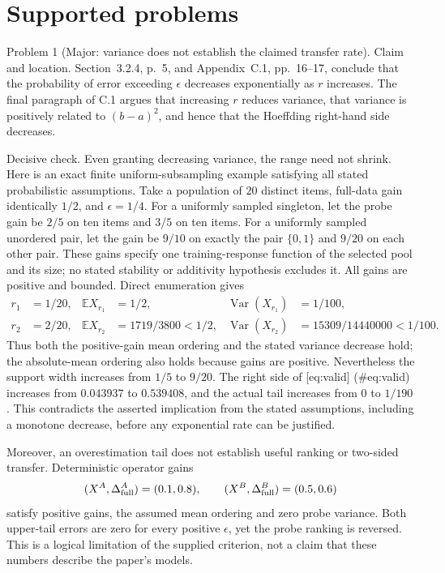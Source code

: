 \documentclass[10pt]{article}
\begin{document}
\section*{Supported problems}
Problem 1 (Major: variance does not establish the claimed transfer rate).  Claim and location. Section 3.2.4, p. 5, and Appendix C.1, pp. 16–17, conclude that the probability of error exceeding \(\epsilon\) decreases exponentially as \(r\) increases. The final paragraph of C.1 argues that increasing \(r\) reduces variance, that variance is positively related to \((b-a)^2\), and hence that the Hoeffding right-hand side decreases.\par
Decisive check. Even granting decreasing variance, the range need not shrink. Here is an exact finite uniform-subsampling example satisfying all stated probabilistic assumptions. Take a population of \(20\) distinct items, full-data gain identically \(1/2\), and \(\epsilon=1/4\). For a uniformly sampled singleton, let the probe gain be \(2/5\) on ten items and \(3/5\) on ten items. For a uniformly sampled unordered pair, let the gain be \(9/10\) on exactly the pair \(\{0,1\}\) and \(9/20\) on each other pair. These gains specify one training-response function of the selected pool and its size; no stated stability or additivity hypothesis excludes it. All gains are positive and bounded. Direct enumeration gives \[\begin{aligned}
 r_1&=1/20,&\mathbb E X_{r_1}&=1/2,&
 \operatorname{Var}(X_{r_1})&=1/100,\\
 r_2&=2/20,&\mathbb E X_{r_2}&=1719/3800<1/2,&
 \operatorname{Var}(X_{r_2})&=15309/14440000<1/100.\end{aligned}\] Thus both the positive-gain mean ordering and the stated variance decrease hold; the absolute-mean ordering also holds because gains are positive. Nevertheless the support width increases from \(1/5\) to \(9/20\). The right side of [eq:valid] (\#eq:valid) increases from \(0.043937\) to \(0.539408\), and the actual tail increases from \(0\) to \(1/190\). This contradicts the asserted implication from the stated assumptions, including a monotone decrease, before any exponential rate can be justified.\par
Moreover, an overestimation tail does not establish useful ranking or two-sided transfer. Deterministic operator gains \[(X^A,\Delta^A_{\rm full})=(0.1,0.8),\qquad
 (X^B,\Delta^B_{\rm full})=(0.5,0.6)\] satisfy positive gains, the assumed mean ordering and zero probe variance. Both upper-tail errors are zero for every positive \(\epsilon\), yet the probe ranking is reversed. This is a logical limitation of the supplied criterion, not a claim that these numbers describe the paper’s models.\par
\end{document}
